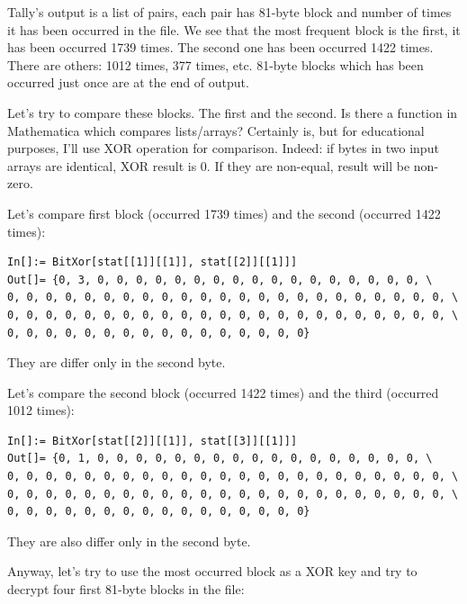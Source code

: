 Tally's output is a list of pairs, each pair has 81-byte block and number of times it has been occurred in the file.
We see that the most frequent block is the first, it has been occurred 1739 times.
The second one has been occurred 1422 times. There are others: 1012 times, 377 times, etc.
81-byte blocks which has been occurred just once are at the end of output.

Let's try to compare these blocks. The first and the second.
Is there a function in Mathematica which compares lists/arrays?
Certainly is, but for educational purposes, I'll use XOR operation for comparison.
Indeed: if bytes in two input arrays are identical, XOR result is 0. If they are non-equal, result will be non-zero.

Let's compare first block (occurred 1739 times) and the second (occurred 1422 times):

\begin{lstlisting}[style=custommath]
In[]:= BitXor[stat[[1]][[1]], stat[[2]][[1]]]
Out[]= {0, 3, 0, 0, 0, 0, 0, 0, 0, 0, 0, 0, 0, 0, 0, 0, 0, 0, 0, \
0, 0, 0, 0, 0, 0, 0, 0, 0, 0, 0, 0, 0, 0, 0, 0, 0, 0, 0, 0, 0, 0, 0, \
0, 0, 0, 0, 0, 0, 0, 0, 0, 0, 0, 0, 0, 0, 0, 0, 0, 0, 0, 0, 0, 0, 0, \
0, 0, 0, 0, 0, 0, 0, 0, 0, 0, 0, 0, 0, 0, 0, 0}
\end{lstlisting}

They are differ only in the second byte.

Let's compare the second block (occurred 1422 times) and the third (occurred 1012 times):

\begin{lstlisting}[style=custommath]
In[]:= BitXor[stat[[2]][[1]], stat[[3]][[1]]]
Out[]= {0, 1, 0, 0, 0, 0, 0, 0, 0, 0, 0, 0, 0, 0, 0, 0, 0, 0, 0, \
0, 0, 0, 0, 0, 0, 0, 0, 0, 0, 0, 0, 0, 0, 0, 0, 0, 0, 0, 0, 0, 0, 0, \
0, 0, 0, 0, 0, 0, 0, 0, 0, 0, 0, 0, 0, 0, 0, 0, 0, 0, 0, 0, 0, 0, 0, \
0, 0, 0, 0, 0, 0, 0, 0, 0, 0, 0, 0, 0, 0, 0, 0}
\end{lstlisting}

They are also differ only in the second byte.

Anyway, let's try to use the most occurred block as a XOR key and try to decrypt four first 81-byte blocks in the file:

